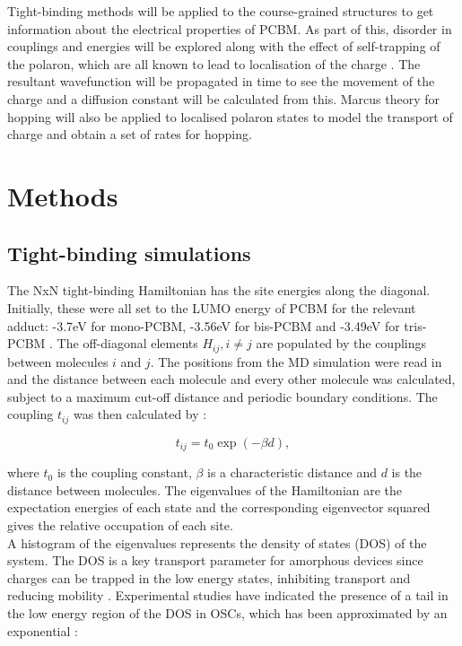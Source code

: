 \documentclass[a4paper,12pt]{article}
\begin{document}
\noindent Tight-binding methods will be applied to the course-grained structures to get information about the electrical properties of PCBM. As part of this, disorder in couplings and energies will be explored along with the effect of self-trapping of the polaron, which are all known to lead to localisation of the charge \cite{Bronold2002} \cite{Lifshitz}. The resultant wavefunction will be propagated in time to see the movement of the charge and a diffusion constant will be calculated from this. Marcus theory for hopping will also be applied to localised polaron states to model the transport of charge and obtain a set of rates for hopping.

\section{Methods}

\subsection{Tight-binding simulations}

\noindent The NxN tight-binding Hamiltonian has the site energies along the diagonal. Initially, these were all set to the LUMO energy of PCBM for the relevant adduct: -3.7eV for mono-PCBM, -3.56eV for bis-PCBM and -3.49eV for tris-PCBM \cite{Frost2010a}. The off-diagonal elements $H_{ij}, i\neq j$ are populated by the couplings between molecules $i$ and $j$. The positions from the MD simulation were read in and the distance between each molecule and every other molecule was calculated, subject to a maximum cut-off distance and periodic boundary conditions. The coupling $t_{ij}$ was then calculated by \cite{Steiner}:

\begin{equation}
 t_{ij}=t_0 \exp (- \beta d), 
 \label{eq:J}
\end{equation} 
 
\noindent where $t_0$ is the coupling constant, $\beta$ is a characteristic distance and $d$ is the distance between molecules. The eigenvalues of the Hamiltonian are the expectation energies of each state and the corresponding eigenvector squared gives the relative occupation of each site.\\

\noindent A histogram of the eigenvalues represents the density of states (DOS) of the system. The DOS is a key transport parameter for amorphous devices since charges can be trapped in the low energy states, inhibiting transport and reducing mobility \cite{Frosta}. Experimental studies have indicated the presence of a tail in the low energy region of the DOS in OSCs, which has been approximated by an exponential \cite{Cody1981}:
\end{document}
